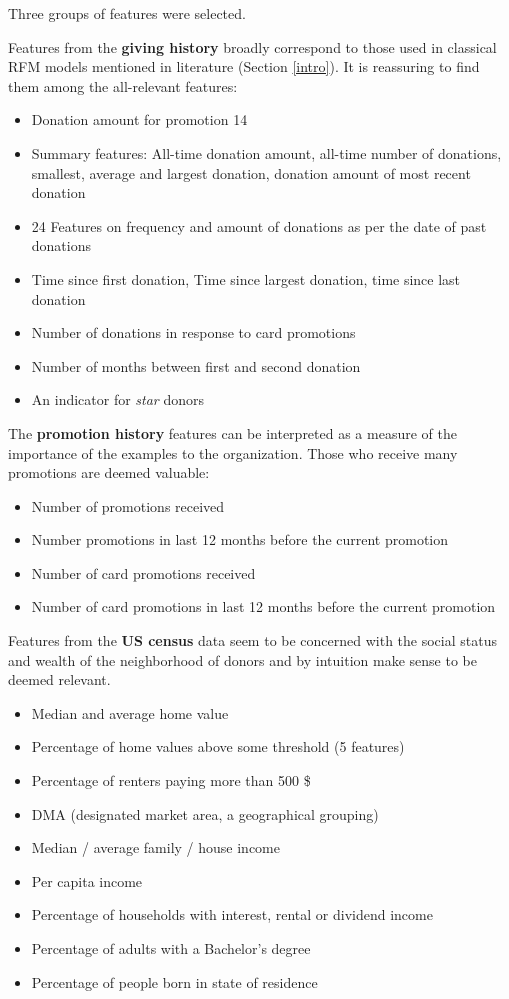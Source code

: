 \documentclass[
  11pt,
  a4paper,
  DIV=12,captions=tableheading,oneside,titlepage]{scrbook}
\providecommand{\tightlist}{%
  \setlength{\itemsep}{0pt}\setlength{\parskip}{0pt}}
\begin{document}
Three groups of features were selected.

Features from the \textbf{giving history} broadly correspond to those used in classical RFM models mentioned in literature (Section \ref{intro}). It is reassuring to find them among the all-relevant features:

\begin{itemize}
\tightlist
\item
  Donation amount for promotion 14
\item
  Summary features: All-time donation amount, all-time number of donations, smallest, average and largest donation, donation amount of most recent donation
\item
  24 Features on frequency and amount of donations as per the date of past donations
\item
  Time since first donation, Time since largest donation, time since last donation
\item
  Number of donations in response to card promotions
\item
  Number of months between first and second donation
\item
  An indicator for \emph{star} donors
\end{itemize}

The \textbf{promotion history} features can be interpreted as a measure of the importance of the examples to the organization. Those who receive many promotions are deemed valuable:

\begin{itemize}
\tightlist
\item
  Number of promotions received
\item
  Number promotions in last 12 months before the current promotion
\item
  Number of card promotions received
\item
  Number of card promotions in last 12 months before the current promotion
\end{itemize}

Features from the \textbf{US census} data seem to be concerned with the social status and wealth of the neighborhood of donors and by intuition make sense to be deemed relevant.

\begin{itemize}
\tightlist
\item
  Median and average home value
\item
  Percentage of home values above some threshold (5 features)
\item
  Percentage of renters paying more than 500 \$
\item
  DMA (designated market area, a geographical grouping)
\item
  Median / average family / house income
\item
  Per capita income
\item
  Percentage of households with interest, rental or dividend income
\item
  Percentage of adults with a Bachelor's degree
\item
  Percentage of people born in state of residence
\end{itemize}
\end{document}
